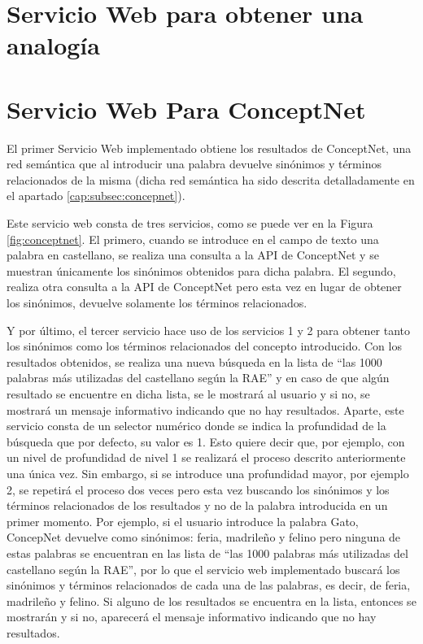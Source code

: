\section{Servicio Web  para obtener una analogía}

\section{Servicio Web Para ConceptNet}
\label{cap:sec:servicioConceptnet}

El primer Servicio Web implementado obtiene los resultados de ConceptNet, una red semántica que al introducir una palabra devuelve sinónimos y términos relacionados de la misma (dicha red semántica ha sido descrita detalladamente en el apartado \ref{cap:subsec:concepnet}).


Este servicio web consta de tres servicios, como se puede ver en la Figura \ref{fig:conceptnet}. El primero, cuando se introduce en el campo de texto una palabra en castellano, se realiza una consulta a la API de ConceptNet y se muestran únicamente los sinónimos obtenidos para dicha palabra. El segundo, realiza otra consulta a la API de ConceptNet pero esta vez en lugar de obtener los sinónimos, devuelve solamente los términos relacionados.

Y por último, el tercer servicio hace uso de los servicios 1 y 2 para obtener tanto los sinónimos como los términos relacionados del concepto introducido. Con los resultados obtenidos, se realiza una nueva búsqueda en la lista de ``las 1000 palabras más utilizadas del castellano según la RAE'' y en caso de que algún resultado se encuentre en dicha lista, se le mostrará al usuario y si no, se mostrará un mensaje informativo indicando que no hay resultados. Aparte, este servicio consta de un selector numérico donde se indica la profundidad de la búsqueda que por defecto, su valor es 1. Esto quiere decir que, por ejemplo, con un nivel de profundidad de nivel 1 se realizará el proceso descrito anteriormente una única vez. Sin embargo, si se introduce una profundidad mayor, por ejemplo 2, se repetirá el proceso dos veces pero esta vez buscando los sinónimos y los términos relacionados de los resultados y no de la palabra introducida en un primer momento. Por ejemplo, si el usuario introduce la palabra Gato, ConcepNet devuelve como sinónimos: feria, madrileño y felino pero ninguna de estas palabras se encuentran en las lista de ``las 1000 palabras más utilizadas del castellano según la RAE'', por lo que el servicio web implementado buscará los sinónimos y términos relacionados de cada una de las palabras, es decir, de feria, madrileño y felino. Si alguno de los resultados se encuentra en la lista, entonces se mostrarán y si no, aparecerá el mensaje informativo indicando que no hay resultados.


